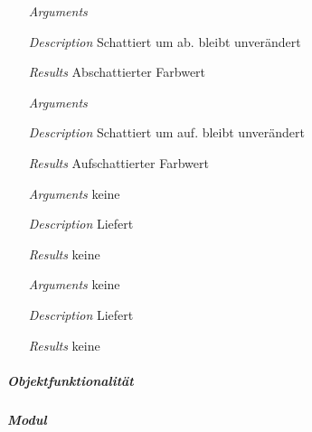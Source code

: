 \begin{description}
\item {}
\begin{enumerate}
\item[\textit{Arguments}] 
\item[\textit{Description}] Schattiert 
um  ab.  bleibt unver\"andert
\item[\textit{Results}] Abschattierter Farbwert
\end{enumerate}

\item {}
\begin{enumerate}
\item[\textit{Arguments}] 
\item[\textit{Description}] Schattiert 
um  auf.  bleibt unver\"andert
\item[\textit{Results}] Aufschattierter Farbwert
\end{enumerate}

\item {}
\begin{enumerate}
\item[\textit{Arguments}] keine
\item[\textit{Description}] Liefert 
\item[\textit{Results}] keine
\end{enumerate}

\item {}
\begin{enumerate}
\item[\textit{Arguments}] keine
\item[\textit{Description}] Liefert 
\item[\textit{Results}] keine
\end{enumerate}

\end{description}

\subparagraph{Objektfunktionalit\"at}



\newpage

\paragraph{}
\subparagraph{Modul} 

